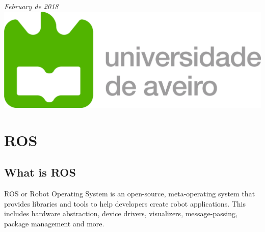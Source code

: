 \documentclass[12pt]{article}
\begin{document}
\begin{titlepage}
{\large \emph{February de 2018}}\\[2cm] %


\includegraphics[scale=0.4]{ua_logo.png} %
 

\vfill %

\end{titlepage}
\tableofcontents
\newpage
\section{ROS}

\subsection{What is ROS}
ROS or Robot Operating System is an open-source, meta-operating system that provides libraries and tools to help developers create robot applications. This includes hardware abstraction, device drivers, visualizers, message-passing, package management and more.
\end{document}

